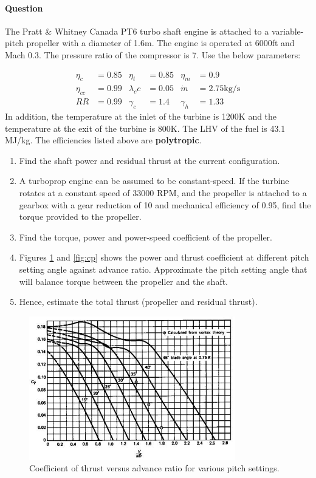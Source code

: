 \documentclass{article}
\begin{document}
\paragraph{Question}
The Pratt \& Whitney Canada PT6 turbo shaft engine is attached to a variable-pitch propeller with a diameter of 1.6m. The engine is operated at 6000ft and Mach 0.3. The pressure ratio of the compressor is 7. Use the below parameters:

\begin{align*}
    \eta_c &= 0.85  &\eta_t &= 0.85 &\eta_m &= 0.9  \\
    \eta_{cc} &= 0.99 & \lambda_cc &= 0.05 &\dot{m} &= 2.75 \text{kg/s}\\
    RR &= 0.99 & \gamma_c &= 1.4 & \gamma_h &= 1.33
\end{align*}
In addition, the temperature at the inlet of the turbine is 1200K and the temperature at the exit of the turbine is 800K. The LHV of the fuel is 43.1 MJ/kg. The efficiencies listed above are \textbf{polytropic}.

\begin{enumerate}
    \item Find the shaft power and residual thrust at the current configuration.
    \item A turboprop engine can be assumed to be constant-speed. If the turbine rotates at a constant speed of 33000 RPM, and the propeller is attached to a gearbox with a gear reduction of 10 and mechanical efficiency of 0.95, find the torque provided to the propeller.
    \item Find the torque, power and power-speed coefficient of the propeller.
    \item Figures \ref{fig:ct} and \ref{fig:cp} shows the power and thrust coefficient at different pitch setting angle against advance ratio. Approximate the pitch setting angle that will balance torque between the propeller and the shaft.
    \item Hence, estimate the total thrust (propeller and residual thrust).
\end{enumerate}

\begin{figure}[H]
    \centering
    \includegraphics[width=0.8\textwidth]{ct.jpg}
    \caption{Coefficient of thrust versus advance ratio for various pitch settings.}
    \label{fig:ct}
\end{figure}
\end{document}
